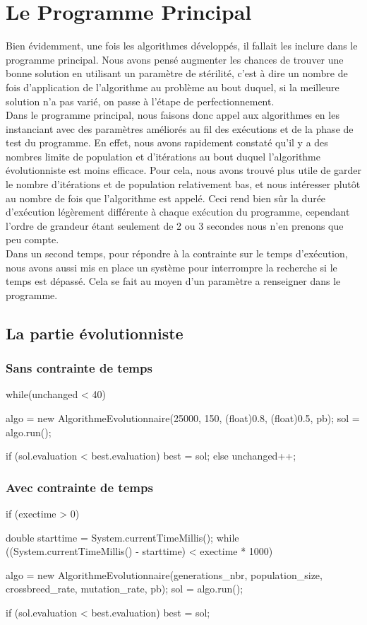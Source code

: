 \section{Le Programme Principal}
Bien évidemment, une fois les algorithmes développés, il fallait les inclure dans le programme principal. Nous avons pensé augmenter les chances de trouver une bonne solution en utilisant un paramètre de stérilité, c'est à dire un nombre de fois d'application de l'algorithme au problème au bout duquel, si la meilleure solution n'a pas varié, on passe à l'étape de perfectionnement.\\
Dans le programme principal, nous faisons donc appel aux algorithmes en les instanciant avec des paramètres améliorés au fil des exécutions et de la phase de test du programme. En effet, nous avons rapidement constaté qu'il y a des nombres limite de population et d'itérations au bout duquel l'algorithme évolutionniste est moins efficace. Pour cela, nous avons trouvé plus utile de garder le nombre d'itérations et de population relativement bas, et nous intéresser plutôt au nombre de fois que l'algorithme est appelé. Ceci rend bien sûr la durée d'exécution légèrement différente à chaque exécution du programme, cependant l'ordre de grandeur étant seulement de 2 ou 3 secondes nous n'en prenons que peu compte.\\
Dans un second temps, pour répondre à la contrainte sur le temps d'exécution, nous avons aussi mis en place un système pour interrompre la recherche si le temps est dépassé. Cela se fait au moyen d'un paramètre a renseigner dans le programme.

\subsection{La partie évolutionniste}
\subsubsection{Sans contrainte de temps}

\begin{java}
while(unchanged < 40) {
	algo = new AlgorithmeEvolutionnaire(25000, 150, (float)0.8, (float)0.5, pb);
	sol = algo.run();
	
	if (sol.evaluation < best.evaluation)
		best = sol;
	else
		unchanged++;
}
\end{java}

\vspace{1em}
\subsubsection{Avec contrainte de temps}
\begin{java}
if (exectime > 0) {
	double starttime = System.currentTimeMillis();
	while ((System.currentTimeMillis() - starttime) < exectime * 1000) {
		algo = new AlgorithmeEvolutionnaire(generations_nbr, population_size, crossbreed_rate, mutation_rate, pb);
		sol = algo.run();
		
		if (sol.evaluation < best.evaluation)
			best = sol;
	}
}
\end{java}

